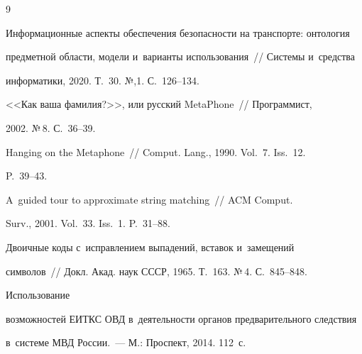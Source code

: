 {\small\frenchspacing


{%




\begin{thebibliography}{9}






Информационные аспекты обеспечения безопасности на транспорте: онтология 


предметной области, модели и~варианты использования~/\!\!/ Системы и~средства 


информатики, 2020. Т.~30. №,1. С.~126--134.




 <<Как ваша фамилия?>>, или русский MetaPhone~/\!\!/ Программист, 


2002. №\,8. С.~36--39.




 Hanging on the Metaphone~/\!\!/ Comput. Lang., 1990. Vol.~7. Iss.~12. 


P.~39--43.




 A~guided tour to approximate string matching~/\!\!/ ACM Comput. 


Surv., 2001. Vol.~33. Iss.~1. P.~31--88.




 Двоичные коды с~исправлением выпадений, вставок и~замещений 


символов~/\!\!/ Докл. Акад. наук СССР, 1965. Т.~163. №\,4. С.~845--848.






 Использование 


возможностей ЕИТКС ОВД в~деятельности органов предварительного следствия 


в~системе МВД России.~--- М.: Проспект, 2014. 112~с.


     \end{thebibliography}


} }





\vspace*{-3pt}





